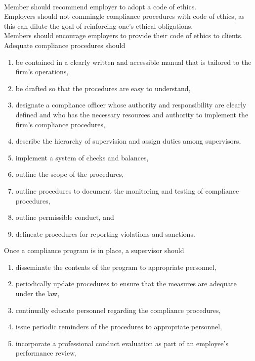 \begin{remark} \\
Member should recommend employer to adopt a code of ethics.\\
Employers should not commingle compliance procedures with code of ethics, as this can dilute the goal of reinforcing one's ethical obligations.\\
Members should encourage employers to provide their code of ethics to clients.\\
Adequate compliance procedures should
\begin{enumerate}[label=\roman*.]
\setlength{\itemsep}{0pt}
\item be contained in a clearly written and accessible manual that is tailored to the firm’s operations,
\item be drafted so that the procedures are easy to understand,
\item designate a compliance officer whose authority and responsibility are clearly defined and who has the necessary resources and authority to implement the firm’s compliance procedures,
\item describe the hierarchy of supervision and assign duties among supervisors,
\item implement a system of checks and balances,
\item outline the scope of the procedures,
\item outline procedures to document the monitoring and testing of compliance procedures,
\item outline permissible conduct, and
\item delineate procedures for reporting violations and sanctions.
\end{enumerate}
Once a compliance program is in place, a supervisor should
\begin{enumerate}[label=\roman*.]
\setlength{\itemsep}{0pt}
\item disseminate the contents of the program to appropriate personnel,
\item periodically update procedures to ensure that the measures are adequate under the law,
\item continually educate personnel regarding the compliance procedures,
\item issue periodic reminders of the procedures to appropriate personnel,
\item incorporate a professional conduct evaluation as part of an employee’s performance review,

\end{enumerate}
\end{remark}
